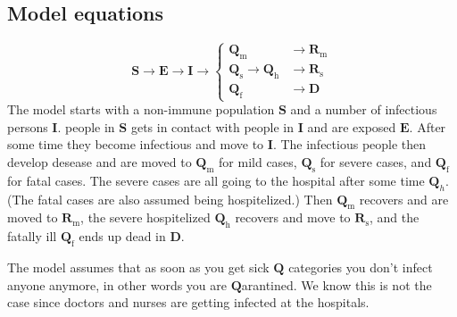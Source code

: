 \documentclass[twoside,11pt]{article}
\newcommand {\hpil}{\rightarrow}
\newcommand{\rmf}{\mathrm{f}}
\newcommand{\rmh}{\mathrm{h}}
\newcommand{\rmm}{\mathrm{m}}
\newcommand{\rms}{\mathrm{s}}
\newcommand{\bmD}{{\mathbf{D}}}
\newcommand{\bmE}{{\mathbf{E}}}
\newcommand{\bmI}{{\mathbf{I}}}
\newcommand{\bmQ}{{\mathbf{Q}}}
\newcommand{\bmR}{{\mathbf{R}}}
\newcommand{\bmS}{{\mathbf{S}}}
\begin{document}
\newcommand{\Tinc}  {\tau_\textrm{inc}}
\newcommand{\Tinf}  {\tau_\textrm{inf}}
\newcommand{\Tdeath}{\tau_\textrm{death}}
\newcommand{\Trecm} {\tau_\textrm{recm}}
\newcommand{\Trecs} {\tau_\textrm{recs}}
\newcommand{\Thosp} {\tau_\textrm{hosp}}
\newcommand{\Tint}  {\tau_\textrm{intervention}}
\newcommand{\Ttd}   {\tau_\textrm{2death}}


\subsection{Model equations}
%
\begin{equation}
 \bmS \hpil \bmE \hpil \bmI \hpil
\begin{cases}
\bmQ_\rmm                     &  \hpil \bmR_\rmm  \\
\bmQ_\rms    \hpil \bmQ_\rmh  &  \hpil \bmR_\rms  \\
\bmQ_\rmf                     &  \hpil \bmD
\end{cases}
\label{eq:}
\end{equation}
%
The model starts with a non-immune population $\bmS$ and a number of infectious persons $\bmI$. people in $\bmS$ gets in contact with people
in $\bmI$ and are exposed $\bmE$.  After some time they become infectious and move to $\bmI$.  The infectious people then develop desease
and are moved to $\bmQ_\rmm$ for mild cases, $\bmQ_\rms$ for severe cases, and $\bmQ_\rmf$ for fatal cases. The severe cases are all
going to the hospital after some time $\bmQ_h$. (The fatal cases are also assumed being hospitelized.) Then $\bmQ_\rmm$ recovers and
are moved to $\bmR_\rmm$, the severe hospitelized $\bmQ_\rmh$ recovers and move to $\bmR_\rms$, and the fatally ill $\bmQ_\rmf$ ends
up dead  in $\bmD$. 

The model assumes that as soon as you get sick $\bmQ$ categories you don't infect anyone anymore, in other words
you are $\bmQ$arantined. We know this is not the case since doctors and nurses are getting infected at the hospitals.
\end{document}
